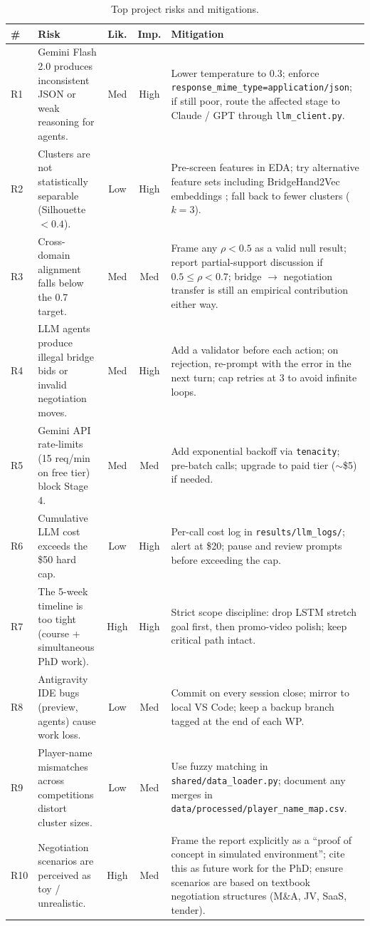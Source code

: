 \documentclass[11pt, a4paper, oneside, openany]{report}
\begin{document}
\begin{table}[H]
\centering\small
\caption{Top project risks and mitigations.}
\label{tab:risks}
\renewcommand{\arraystretch}{1.25}
\begin{tabularx}{\textwidth}{p{0.5cm} X c c X}
\toprule
\textbf{\#} & \textbf{Risk} & \textbf{Lik.} & \textbf{Imp.} & \textbf{Mitigation} \\
\midrule
R1 & Gemini Flash 2.0 produces inconsistent JSON or weak reasoning for agents. & Med & High & Lower temperature to 0.3; enforce \texttt{response\_mime\_type=application/json}; if still poor, route the affected stage to Claude / GPT through \texttt{llm\_client.py}. \\
R2 & Clusters are not statistically separable (Silhouette $< 0.4$). & Low & High & Pre-screen features in EDA; try alternative feature sets including BridgeHand2Vec embeddings \citep{sztyber2023bridgehand}; fall back to fewer clusters ($k=3$). \\
R3 & Cross-domain alignment falls below the 0.7 target. & Med & Med & Frame any $\rho < 0.5$ as a valid null result; report partial-support discussion if $0.5 \leq \rho < 0.7$; bridge $\rightarrow$ negotiation transfer is still an empirical contribution either way. \\
R4 & LLM agents produce illegal bridge bids or invalid negotiation moves. & Med & High & Add a validator before each action; on rejection, re-prompt with the error in the next turn; cap retries at 3 to avoid infinite loops. \\
R5 & Gemini API rate-limits (15 req/min on free tier) block Stage 4. & Med & Med & Add exponential backoff via \texttt{tenacity}; pre-batch calls; upgrade to paid tier ($\sim$\$5) if needed. \\
R6 & Cumulative LLM cost exceeds the \$50 hard cap. & Low & High & Per-call cost log in \texttt{results/llm\_logs/}; alert at \$20; pause and review prompts before exceeding the cap. \\
R7 & The 5-week timeline is too tight (course + simultaneous PhD work). & High & High & Strict scope discipline: drop LSTM stretch goal first, then promo-video polish; keep critical path intact. \\
R8 & Antigravity IDE bugs (preview, agents) cause work loss. & Low & Med & Commit on every session close; mirror to local VS Code; keep a backup branch tagged at the end of each WP. \\
R9 & Player-name mismatches across competitions distort cluster sizes. & Low & Med & Use fuzzy matching in \texttt{shared/data\_loader.py}; document any merges in \texttt{data/processed/player\_name\_map.csv}. \\
R10 & Negotiation scenarios are perceived as toy / unrealistic. & High & Med & Frame the report explicitly as a ``proof of concept in simulated environment''; cite this as future work for the PhD; ensure scenarios are based on textbook negotiation structures (M\&A, JV, SaaS, tender). \\
\bottomrule
\end{tabularx}
\end{table}
\end{document}
